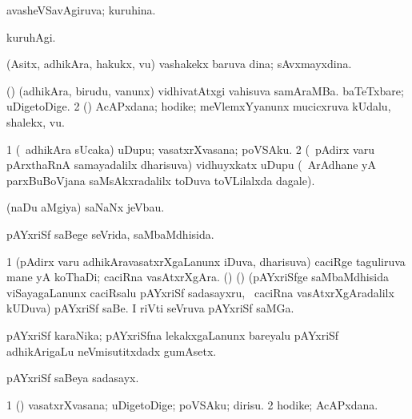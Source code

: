 \bentry
{} 
\gl{\gu}
\expl{}
\bmng
 avasheVSavAgiruva; kuruhina. 
\emng
\eentry

\bentry 
{} 
\gl{\kirxvi}
\expl{}
\bmng
 kuruhAgi. 
\emng
\eentry

\bentry
{}
\gl{\nA}
\expl{}
\bmng
 (Asitx, adhikAra, hakukx, \mo vu) vashakekx baruva dina; sAvxmayxdina. 
\emng
\eentry

\bentry
{} 
\gl{\nA}
\expl{}
\bmng
\bnum
{} (\pArxparx) 
\banum
{} (adhikAra, birudu, \mo vanunx) vidhivatAtxgi vahisuva samAraMBa. 
 baTeTxbare; uDigetoDige. 
\eanum
\numie
\num{2} (\pArxvi) AcAPxdana; hodike; meVlemxYyanunx mucicxruva kUdalu, shalekx, \mo vu. 
\enum
\emng
\eentry

\bentry
{} 
\gl{\nA}
\expl{}
\bmng
\bnum
\num{1} (\kanmu\ adhikAra sUcaka) uDupu; vasatxrXvasana; poVSAku. 
\num{2} (\kanmu\ pAdirx \mo varu pArxthaRnA samayadalilx dharisuva) vidhuyxkatx uDupu (\kanmu\ ArAdhane yA parxBuBoVjana saMsAkxradalilx toDuva toVLilalxda dagale). 
\enum
\emng
\eentry

\bentry
{} 
\gl{\nA}
\expl{}
\bmng
 (naDu aMgiya) saNaNx jeVbau. 
\emng
\eentry

\bentry
{} 
\gl{\gu}
\expl{}
\bmng
 pAYxriSf saBege seVrida, saMbaMdhisida. 
\emng
\eentry

\bentry
{} 
\gl{\nA}
\bmng
\bnum
\num{1} (pAdirx \mo varu adhikAravasatxrXgaLanunx iDuva, dharisuva) caciRge taguliruva mane yA koThaDi; caciRna vasAtxrXgAra. 
 (\ca) (\birx) 
\banum
{} (pAYxriSfge saMbaMdhisida viSayagaLanunx caciRsalu pAYxriSf sadasayxru, \kanmu\ caciRna vasAtxrXgAradalilx kUDuva) pAYxriSf saBe. 
 I riVti seVruva pAYxriSf saMGa. 
\eanum
\numie
\enum
\emng
\eentry

\bentry
{} 
\gl{\nA}
\expl{}
\bmng
 pAYxriSf karaNika; pAYxriSfna lekakxgaLanunx bareyalu pAYxriSf adhikArigaLu neVmisutitxdadx gumAsetx. 
\emng
\eentry

\bentry
{} 
\gl{\nA}
\bmng
 pAYxriSf saBeya sadasayx. 
\emng
\eentry

\bentry
{} 
\gl{\nA}
\expl{}
\bmng
\bnum
\num{1} (\kAparx) vasatxrXvasana; uDigetoDige; poVSAku; dirisu. 
\num{2} hodike; AcAPxdana. 
\enum
\emng
\eentry

